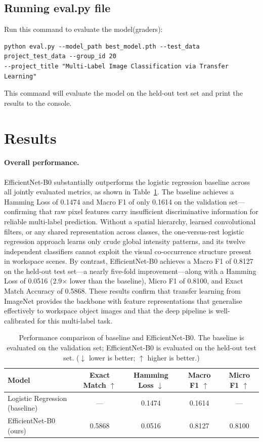 \documentclass[10pt]{article}
\begin{document}
\subsection*{Running eval.py file}

Run this command to evaluate the model(graders):

\begin{verbatim}
python eval.py --model_path best_model.pth --test_data project_test_data --group_id 20 
--project_title "Multi-Label Image Classification via Transfer Learning"
\end{verbatim}

This command will evaluate the model on the held-out test set and print the results to the console.


\section{Results}

\paragraph{Overall performance.}
EfficientNet-B0 substantially outperforms the logistic regression baseline across all jointly
evaluated metrics, as shown in Table~\ref{tab:overall}.  The baseline achieves a Hamming Loss of
0.1474 and Macro F1 of only 0.1614 on the validation set---confirming that raw pixel features
carry insufficient discriminative information for reliable multi-label prediction.  Without a
spatial hierarchy, learned convolutional filters, or any shared representation across classes,
the one-versus-rest logistic regression approach learns only crude global intensity patterns, and
its twelve independent classifiers cannot exploit the visual co-occurrence structure present in
workspace scenes.  By contrast, EfficientNet-B0 achieves a Macro F1 of 0.8127 on the held-out
test set---a nearly five-fold improvement---along with a Hamming Loss of 0.0516 (2.9$\times$
lower than the baseline), Micro F1 of 0.8100, and Exact Match Accuracy of 0.5868.  These results
confirm that transfer learning from ImageNet provides the backbone with feature representations
that generalise effectively to workspace object images and that the deep pipeline is
well-calibrated for this multi-label task.

\begin{table}[htbp]
\centering
\caption{Performance comparison of baseline and EfficientNet-B0.  The baseline is evaluated on
         the validation set; EfficientNet-B0 is evaluated on the held-out test set.
         ($\downarrow$ lower is better; $\uparrow$ higher is better.)}
\label{tab:overall}
\begin{tabular}{lcccc}
\toprule
Model & Exact Match $\uparrow$ & Hamming Loss $\downarrow$ & Macro F1 $\uparrow$ & Micro F1 $\uparrow$ \\
\midrule
Logistic Regression (baseline) & ---    & 0.1474 & 0.1614 & ---    \\
EfficientNet-B0 (ours)         & 0.5868 & 0.0516 & 0.8127 & 0.8100 \\
\bottomrule
\end{tabular}
\end{table}
\end{document}
